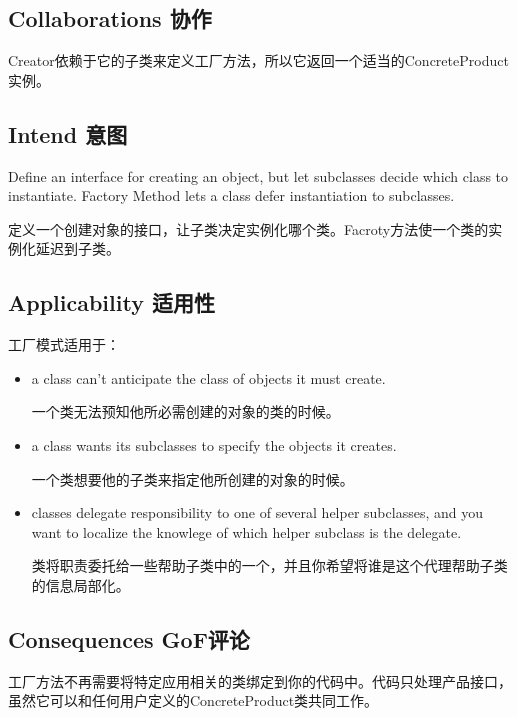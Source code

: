 \subsection{Collaborations 协作}

Creator依赖于它的子类来定义工厂方法，所以它返回一个适当的ConcreteProduct实例。

\subsection{Intend 意图}

Define an interface for creating an object, but let subclasses decide which class to instantiate. Factory Method lets a class defer instantiation to subclasses.

定义一个创建对象的接口，让子类决定实例化哪个类。Facroty方法使一个类的实例化延迟到子类。

\subsection{Applicability 适用性}

工厂模式适用于：

\begin{itemize}

\item a class can't anticipate the class of objects it must create.
	
	  一个类无法预知他所必需创建的对象的类的时候。

\item a class wants its subclasses to specify the objects it creates.

	  一个类想要他的子类来指定他所创建的对象的时候。

\item classes delegate responsibility to one of several helper subclasses, and you want to localize the knowlege of which helper subclass is the delegate.

	  类将职责委托给一些帮助子类中的一个，并且你希望将谁是这个代理帮助子类的信息局部化。

\end{itemize}

\subsection{Consequences GoF评论}

工厂方法不再需要将特定应用相关的类绑定到你的代码中。代码只处理产品接口，虽然它可以和任何用户定义的ConcreteProduct类共同工作。

